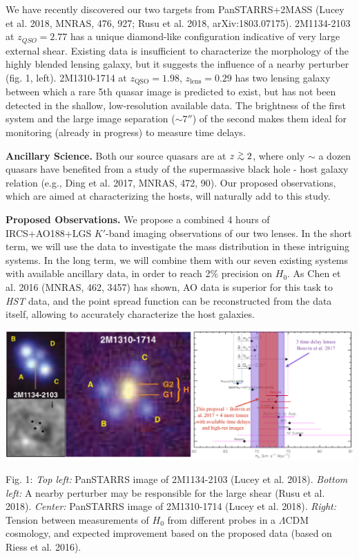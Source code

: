 \documentclass[a4paper,11pt]{article}
\newcommand{\gtrsim}{\lower.5ex\hbox{$\; \buildrel > \over \sim \;$}}
\begin{document}
 We have recently discovered our two targets from PanSTARRS+2MASS (Lucey et al. 2018, MNRAS, 476, 927; Rusu et al. 2018, arXiv:1803.07175). 2M1134-2103 at $z_{QSO}=2.77$ has a unique diamond-like configuration indicative of very large external shear. Existing data is insufficient to characterize the morphology of the highly blended lensing galaxy, but it suggests the influence of a nearby perturber (fig. 1, left). 2M1310-1714 at $z_\mathrm{QSO}=1.98$, $z_\mathrm{lens}=0.29$ has two lensing galaxy between which a rare 5th quasar image is predicted to exist, but has not been detected in the shallow, low-resolution available data. The brightness of the first system and the large image separation ($\sim7''$) of the second makes them ideal for monitoring (already in progress) to measure time delays.

{\bf Ancillary Science.} Both our source quasars are at $z\gtrsim2$, where only $\sim$ a dozen quasars have benefited from a study of the supermassive black hole - host galaxy relation (e.g., Ding et al. 2017, MNRAS, 472, 90). Our proposed observations, which are aimed at characterizing the hosts, will naturally add to this study.

{\bf Proposed Observations.} We propose a combined 4 hours of IRCS+AO188+LGS $K'$-band imaging observations of our two lenses. In the short term, we will use the data to investigate the mass distribution in these intriguing systems. In the long term, we will combine them with our seven existing systems with available ancillary data, in order to reach 2\% precision on $H_{0}$. As Chen et al. 2016 (MNRAS, 462, 3457) has shown, AO data is superior for this task to \textit{HST} data, and the point spread function can be reconstructed from the data itself, allowing to accurately characterize the host galaxies. 

\begin{minipage}{\textwidth}
\includegraphics[width=0.95\hsize]{figure.eps}
\end{minipage}
Fig. 1: {\it Top left:} PanSTARRS image of 2M1134-2103 (Lucey et al. 2018). {\it Bottom left:} A nearby perturber may be responsible for the large shear (Rusu et al. 2018). {\it Center:} PanSTARRS image of 2M1310-1714 (Lucey et al. 2018). {\it Right:} Tension between measurements of $H_{0}$ from different probes in a $\Lambda$CDM cosmology, and expected improvement based on the proposed data (based on Riess et al. 2016).
  
\end{document}
